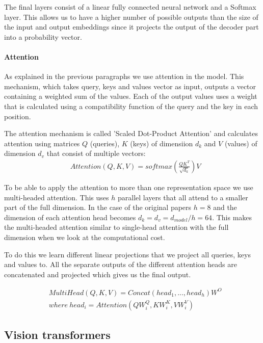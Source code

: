 The final layers consist of a linear fully connected neural network and a Softmax layer. This allows us to have a higher number of possible outputs than the size of the input and output embeddings since it projects the output of the decoder part into a probability vector.

\paragraph{Attention}

As explained in the previous paragraphs we use attention in the model. This mechanism, which takes query, keys and values vector as input, outputs a vector containing a weighted sum of the values. Each of the output values uses a weight that is calculated using a compatibility  function of the query and the key in each position.

The attention mechanism \cite{vaswani_attention_2017} is called 'Scaled Dot-Product Attention' and calculates attention using matrices $Q$ (queries), $K$ (keys) of dimensiion $d_k$ and $V$ (values) of dimension $d_v$ that consist of multiple vectors:
\begin{align}
\label{eq:prelim:softmax-attention}
&Attention(Q, K, V) = softmax(\frac{QK^T} {\sqrt{d_k}})V
\end{align}

To be able to apply the attention to more than one representation space we use multi-headed attention. This uses $h$ parallel layers that all attend to a smaller part of the full dimension. In the case of the original papers $h = 8$ and the dimension of each attention head becomes $d_k = d_v = d_{model} / h = 64$. This makes the multi-headed attention similar to single-head attention with the full dimension when we look at the computational cost.

To do this we learn different linear projections that we project all queries, keys and values to.  All the separate outputs of the different attention heads are concatenated and projected which gives us the final output.

\begin{align}
&MultiHead(Q, K, V) = Concat(head_1, ..., head_h)W^O\\
& where\ head_i = Attention(QW_i^Q, KW_i^K, VW_i^V)
\end{align}


\subsection{Vision transformers}
\label{sec:prelim:transformers:vision}

